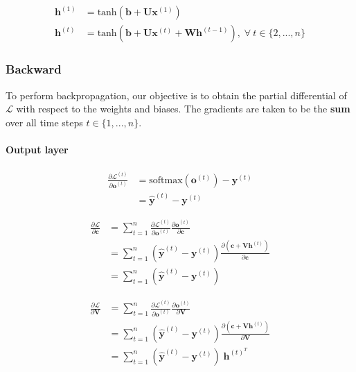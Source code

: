 \documentclass{article}
\numberwithin{equation}{section}
\begin{document}
\begin{equation}
\label{eqn:forward-h}
\begin{split}
	\bm{h}^{(1)} &= \text{tanh}(\bm{b} + \bm{U}\bm{x}^{(1)}) \\
	\bm{h}^{(t)} &= \text{tanh}(\bm{b} + \bm{U}\bm{x}^{(t)} + \bm{W}\bm{h}^{(t-1)}),\;
		\forall\: t \in \{2, ..., n\}
\end{split}
\end{equation}

\subsubsection{Backward}
To perform backpropagation, our objective is to obtain the partial differential of $\mathcal{L}$ with respect to the weights and biases. The gradients are taken to be the \textbf{sum} over all time steps $t \in \{1, ..., n\}$.

\paragraph{Output layer}
\begin{equation}
\label{eqn:backward-o}
\begin{split}
	\frac{\partial \mathcal{L}^{(t)}}{\partial \bm{o}^{(t)}}
		&= \text{softmax}(\bm{o}^{(t)}) - \bm{y}^{(t)} \\
		&= \hat{\bm{y}}^{(t)} - \bm{y}^{(t)}
\end{split}
\end{equation}

\begin{equation}
\label{eqn:backward-c}
\begin{split}
	\frac{\partial \mathcal{L}}{\partial \bm{c}}
		&= \sum_{t=1}^n \frac{\partial \mathcal{L}^{(t)}}{\partial \bm{o}^{(t)}} \frac{\partial \bm{o}^{(t)}}{\partial \bm{c}} \\
		&= \sum_{t=1}^n (\hat{\bm{y}}^{(t)} - \bm{y}^{(t)}) \frac{\partial(\bm{c} + \bm{V}\bm{h}^{(t)})}{\partial \bm{c}} \\
		&= \sum_{t=1}^n (\hat{\bm{y}}^{(t)} - \bm{y}^{(t)})
\end{split}
\end{equation}

\begin{equation}
\label{eqn:backward-V}
\begin{split}
	\frac{\partial \mathcal{L}}{\partial \bm{V}}
		&= \sum_{t=1}^n \frac{\partial \mathcal{L}^{(t)}}{\partial \bm{o}^{(t)}} \frac{\partial \bm{o}^{(t)}}{\partial \bm{V}} \\
		&= \sum_{t=1}^n (\hat{\bm{y}}^{(t)} - \bm{y}^{(t)}) \frac{\partial(\bm{c} + \bm{V}\bm{h}^{(t)})}{\partial \bm{V}} \\
		&= \sum_{t=1}^n (\hat{\bm{y}}^{(t)} - \bm{y}^{(t)}) \; \bm{h}^{(t)^T}
\end{split}
\end{equation}
\end{document}
